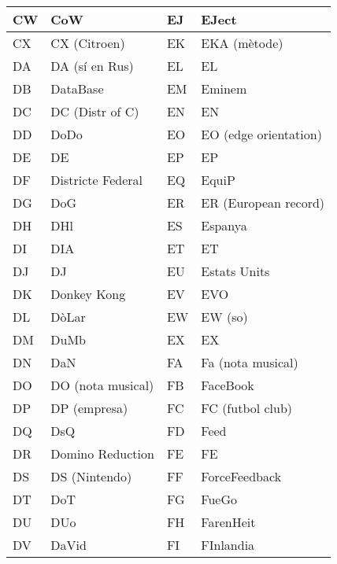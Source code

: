\begin{table}[!ht]
    \centering
    \begin{tabular}{|l|l|l|l|}
    \hline
    CW & CoW               & EJ & EJect                 \\ \hline 
    CX & CX (Citroen)      & EK & EKA (mètode)          \\ \hline
    DA & DA (sí en Rus)    & EL & EL                    \\ \hline
    DB & DataBase          & EM & Eminem                \\ \hline
    DC & DC (Distr of C)   & EN & EN                    \\ \hline
    DD & DoDo              & EO & EO (edge orientation) \\ \hline
    DE & DE                & EP & EP                    \\ \hline
    DF & Districte Federal & EQ & EquiP                 \\ \hline
    DG & DoG               & ER & ER (European record)  \\ \hline
    DH & DHl               & ES & Espanya               \\ \hline
    DI & DIA               & ET & ET                    \\ \hline
    DJ & DJ                & EU & Estats Units          \\ \hline
    DK & Donkey Kong       & EV & EVO                   \\ \hline
    DL & DòLar             & EW & EW (so)               \\ \hline
    DM & DuMb              & EX & EX                    \\ \hline
    DN & DaN               & FA & Fa (nota musical)     \\ \hline
    DO & DO (nota musical) & FB & FaceBook              \\ \hline
    DP & DP (empresa)      & FC & FC (futbol club)      \\ \hline
    DQ & DsQ               & FD & Feed                  \\ \hline
    DR & Domino Reduction  & FE & FE                    \\ \hline
    DS & DS (Nintendo)     & FF & ForceFeedback         \\ \hline
    DT & DoT               & FG & FueGo                 \\ \hline
    DU & DUo               & FH & FarenHeit             \\ \hline
    DV & DaVid             & FI & FInlandia             \\ \hline

\end{tabular}
\end{table}
